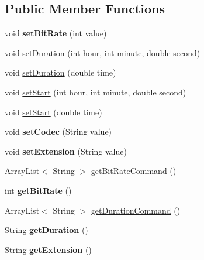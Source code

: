 \subsection*{Public Member Functions}
\begin{DoxyCompactItemize}
\item 
\hypertarget{classvideo_1_1_profile_af9d70daf499e7d885ca543985f970cee}{
void {\bfseries setBitRate} (int value)}
\label{classvideo_1_1_profile_af9d70daf499e7d885ca543985f970cee}

\item 
void \hyperlink{classvideo_1_1_profile_a05e545e89665f73c6b52ed0b5809e925}{setDuration} (int hour, int minute, double second)
\item 
void \hyperlink{classvideo_1_1_profile_a2272c75453c3b9d64ff63a43ed1f1e84}{setDuration} (double time)
\item 
void \hyperlink{classvideo_1_1_profile_a15f5377f9cb3d92e6c7dd033f37f0539}{setStart} (int hour, int minute, double second)
\item 
void \hyperlink{classvideo_1_1_profile_a3d97ab049cee8491c4bcbab544de3f22}{setStart} (double time)
\item 
\hypertarget{classvideo_1_1_profile_a7437ae87933a7b856d068de0ba30620d}{
void {\bfseries setCodec} (String value)}
\label{classvideo_1_1_profile_a7437ae87933a7b856d068de0ba30620d}

\item 
\hypertarget{classvideo_1_1_profile_a30daf3b33a26f8f6cc177fb5fde01356}{
void {\bfseries setExtension} (String value)}
\label{classvideo_1_1_profile_a30daf3b33a26f8f6cc177fb5fde01356}

\item 
ArrayList$<$ String $>$ \hyperlink{classvideo_1_1_profile_aa356b9144652c16e8702233b961fcfb0}{getBitRateCommand} ()
\item 
\hypertarget{classvideo_1_1_profile_a20b6dcc639aa1e3fca372625ffd19643}{
int {\bfseries getBitRate} ()}
\label{classvideo_1_1_profile_a20b6dcc639aa1e3fca372625ffd19643}

\item 
ArrayList$<$ String $>$ \hyperlink{classvideo_1_1_profile_ad9033fca02cf6eac9c4548364530fdb7}{getDurationCommand} ()
\item 
\hypertarget{classvideo_1_1_profile_a2f3d7bc049b32a00480cda415970bbeb}{
String {\bfseries getDuration} ()}
\label{classvideo_1_1_profile_a2f3d7bc049b32a00480cda415970bbeb}

\item 
\hypertarget{classvideo_1_1_profile_a944ed8d8a43b3a520f6a869744c93911}{
String {\bfseries getExtension} ()}
\label{classvideo_1_1_profile_a944ed8d8a43b3a520f6a869744c93911}


\end{DoxyCompactItemize}
